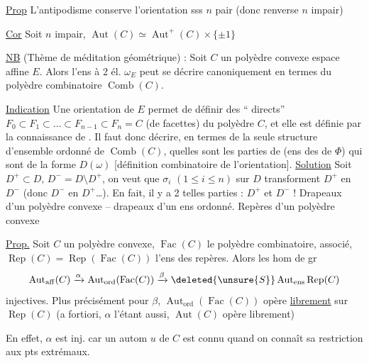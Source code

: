 \uline{Prop} L'antipodisme conserve l'orientation sss $n$ pair (donc  renverse  $n$ impair)

\uline{Cor} Soit $n$ impair, $\operatorname{Aut}(C)\simeq\operatorname{Aut}^+(C)\times\{\pm1\}$

\uline{NB} (Thème de méditation géométrique) : Soit $C$ un polyèdre convexe  espace affine $E$. Alors l'ens à 2 él. $\omega_E$ peut se décrire canoniquement en termes du polyèdre combinatoire $\operatorname{Comb}(C)$.

\uline{Indication} Une orientation \inserted{$\omega$} de $E$ permet de définir  des ``  directs'' $F_0\subset F_1\subset\ldots\subset F_{n-1}\subset F_n=C$ (de facettes) du polyèdre $C$, et elle est définie par la connaissance de  . Il faut donc décrire, en termes de la seule structure d'ensemble ordonné de \inserted{$\Phi=$}$\operatorname{Comb}(C)$, quelles sont les parties de   (ens des   de $\Phi$) qui sont de la forme $D(\omega)$ [définition combinatoire de l'orientation]. \uline{Solution} Soit $D^+\subset D$, $D^-=D\setminus D^+$, on veut que  $\sigma_i$ $(1\leq i\leq n)$ sur $D$ transforment $D^+$ en $D^-$ (donc $D^-$ en $D^+$\ldots). En fait, il y a  2 telles parties : $D^+$ et $D^-$ !
\margin{$\leftarrow$}Drapeaux d'un polyèdre convexe -- drapeaux d'un ens ordonné. Repères d'un polyèdre convexe

\uline{Prop.} Soit $C$ un polyèdre convexe, $\operatorname{Fac}(C)$ le polyèdre combinatoire, associé, $\operatorname{Rep}(C)=\operatorname{Rep}(\operatorname{Fac}(C))$ l'ens des repères. Alors les  hom de gr
\[
\operatorname{Aut}_{\mathrm{aff}}(C)\xrightarrow{\alpha}\operatorname{Aut}_{\mathrm{ord}}(\operatorname{Fac}(C))\xrightarrow{\beta}\deleted{\unsure{S}}\operatorname{Aut}_{\mathrm{ens}}\operatorname{Rep}(C)
\]
 injectives. Plus précisément pour $\beta$, $\operatorname{Aut}_{\mathrm{ord}}(\operatorname{Fac}(C))$ opère \uline{librement} sur $\operatorname{Rep}(C)$ (a fortiori, $\alpha$ l'étant aussi, $\operatorname{Aut}(C)$ opère librement)

En effet, $\alpha$ est inj. car un autom $u$ de $C$ est connu quand on connaît sa restriction aux pts extrémaux.


